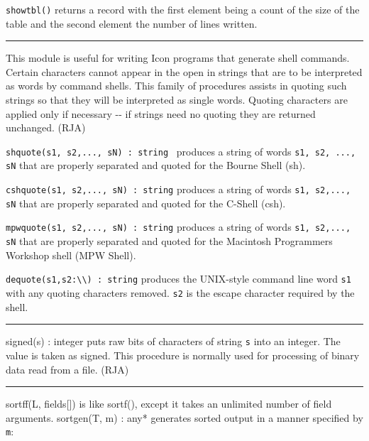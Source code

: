 \texttt{showtbl()} returns a record with the first element being a count
of the size of the table and the second element the number of lines
written. 

\vspace{0.25cm}\hrule{}

This module is useful for writing Icon programs that generate
shell commands. Certain characters cannot appear
in the open in strings that are to be interpreted as
{\textquotedbl}words{\textquotedbl} by command shells. This family of
procedures assists in quoting such strings so that they will be
interpreted as single words. Quoting characters are applied only if
necessary -{}- if strings need no quoting they are returned unchanged.
(RJA)

\texttt{shquote(s1, s2,..., sN) : string} \ produces a string of words
\texttt{s1, s2, ..., sN} that are properly separated and quoted for the
Bourne Shell (sh).

\texttt{cshquote(s1, s2,..., sN) : string} produces a string of words
\texttt{s1, s2,..., sN} that are properly separated and quoted for the
C-Shell (csh).

\texttt{mpwquote(s1, s2,..., sN) : string} produces a string of words
\texttt{s1, s2,..., sN} that are properly separated and quoted for the
Macintosh Programmer{\textquotesingle}s Workshop shell (MPW Shell).

\texttt{dequote(s1,s2:{\textquotedbl}{\textbackslash}{\textbackslash}{\textquotedbl})
: string} produces the UNIX-style command line word \texttt{s1} with
any quoting characters removed. \texttt{s2} is the escape character
required by the shell.

\vspace{0.25cm}\hrule{}

\textsf{signed(s) : integer} puts raw bits of characters of string
\texttt{s} into an integer. The value is taken as signed. This
procedure is normally used for processing of binary data read from a
file. (RJA)

\vspace{0.25cm}\hrule{}

\textsf{sort}\textsf{ff(L, fields[])} is like
\textsf{sortf()}, except it takes an unlimited number of field arguments. \textsf{sortgen(T, m) : any*} generates sorted
output in a manner specified by \texttt{m}:

